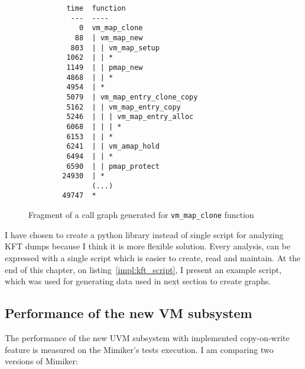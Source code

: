 \begin{figure}[h]
  \centering
  \begin{verbatim}
         time  function
          ---  ----
            0  vm_map_clone
           88  | vm_map_new
          803  | | vm_map_setup
         1062  | | *
         1149  | | pmap_new
         4868  | | *
         4954  | *
         5079  | vm_map_entry_clone_copy
         5162  | | vm_map_entry_copy
         5246  | | | vm_map_entry_alloc
         6068  | | | *
         6153  | | *
         6241  | | vm_amap_hold
         6494  | | *
         6590  | | pmap_protect
        24930  | *
               (...)
        49747  *
  \end{verbatim}
  \caption{Fragment of a call graph generated for \texttt{vm_map_clone} function}
  \label{fig:call_graph}
\end{figure}

I have chosen to create a python library instead of single script for analyzing KFT dumps because I think it is more flexible solution.
Every analysis, can be expressed with a single script which is easier to create, read and maintain.
At the end of this chapter, on listing~\ref{impl:kft_script}, I present an example script, which was used for generating data used in next section to create graphs.

%

\subsection{Performance of the new VM subsystem}

The performance of the new UVM subsystem with implemented copy-on-write feature is measured on the Mimiker's tests execution.
I am comparing two versions of Mimiker:

